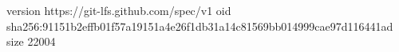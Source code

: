 version https://git-lfs.github.com/spec/v1
oid sha256:91151b2effb01f57a19151a4e26f1db31a14c81569bb014999cae97d116441ad
size 22004
